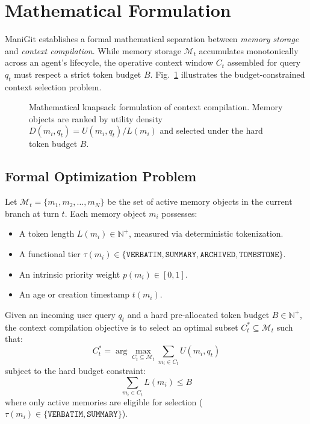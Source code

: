 \section{Mathematical Formulation}
\label{sec:mathematical_formulation}

ManiGit establishes a formal mathematical separation between \textit{memory storage} and \textit{context compilation}. While memory storage $\mathcal{M}_t$ accumulates monotonically across an agent's lifecycle, the operative context window $C_t$ assembled for query $q_t$ must respect a strict token budget $B$. Fig.~\ref{fig:context_compilation} illustrates the budget-constrained context selection problem.

\begin{figure}[t]
\centering

\caption{Mathematical knapsack formulation of context compilation. Memory objects are ranked by utility density $D(m_i,q_t)=U(m_i,q_t)/L(m_i)$ and selected under the hard token budget $B$.}
\label{fig:context_compilation}
\end{figure}

\subsection{Formal Optimization Problem}
Let $\mathcal{M}_t = \{m_1, m_2, \dots, m_N\}$ be the set of active memory objects in the current branch at turn $t$. Each memory object $m_i$ possesses:
\begin{itemize}
    \item A token length $L(m_i) \in \mathbb{N}^+$, measured via deterministic tokenization.
    \item A functional tier $\tau(m_i) \in \{\texttt{VERBATIM}, \texttt{SUMMARY}, \texttt{ARCHIVED}, \texttt{TOMBSTONE}\}$.
    \item An intrinsic priority weight $p(m_i) \in [0, 1]$.
    \item An age or creation timestamp $t(m_i)$.
\end{itemize}

Given an incoming user query $q_t$ and a hard pre-allocated token budget $B \in \mathbb{N}^+$, the context compilation objective is to select an optimal subset $C_t^* \subseteq \mathcal{M}_t$ such that:
\begin{equation}
C_t^* = \arg\max_{C_t \subseteq \mathcal{M}_t} \sum_{m_i \in C_t} U(m_i, q_t)
\label{eq:knapsack_obj}
\end{equation}
subject to the hard budget constraint:
\begin{equation}
\sum_{m_i \in C_t} L(m_i) \le B
\label{eq:knapsack_constraint}
\end{equation}
where only active memories are eligible for selection ($\tau(m_i) \in \{\texttt{VERBATIM}, \texttt{SUMMARY}\}$).

